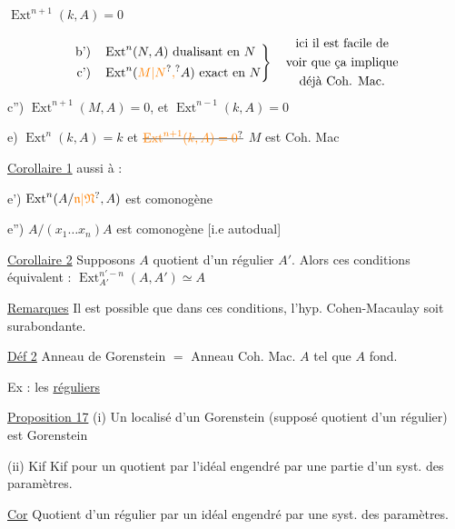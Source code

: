  $\operatorname{Ext}^{n+1}(k,A)=0$

\[
\left.\begin{aligned}
 \text{b')}\quad &\operatorname{Ext}^{n}(N,A)\ \text{dualisant en }N\\
 \text{c')}\quad &\operatorname{Ext}^{n}(\unsure{M|N}\unsure{,}A)\ \text{exact en }N
\end{aligned}\right\}
\quad\begin{gathered}\text{ici il est facile de}\\\text{voir que ça implique}\\\text{déjà Coh. Mac.}\end{gathered}
\]
c'') $\operatorname{Ext}^{n+1}(M,A)=0$, et $\operatorname{Ext}^{n-1}(k,A)=0$

e) $\operatorname{Ext}^{n}(k,A)=k$ et $\deleted{\unsure{\operatorname{Ext}^{n+1}(k,A)=0}}$ $M$ est Coh. Mac



\uline{Corollaire 1}  aussi à :

e') $\operatorname{Ext}^{n}(A/\unsure{\mathfrak n|\mathfrak N},A)$ est comonogène

e'') $A/(x_1\ldots x_n)A$ est comonogène [i.e autodual]

\uline{Corollaire 2} Supposons $A$ quotient d'un régulier $A'$. Alors ces conditions équivalent : $\operatorname{Ext}_{A'}^{n'-n}(A,A')\simeq A$

\uline{Remarques}  Il est possible que dans  ces conditions, l'hyp. Cohen-Macaulay soit surabondante.

\uline{Déf 2} Anneau de Gorenstein $=$ Anneau Coh. Mac. $A$ tel que $A$  fond.

Ex : les \uline{réguliers}

\uline{Proposition 17} (i) Un localisé d'un Gorenstein (supposé quotient d'un régulier) est Gorenstein

(ii) Kif Kif pour un quotient par l'idéal engendré par une partie d'un syst. des paramètres.

\uline{Cor} Quotient d'un régulier par un idéal engendré par une  syst. des paramètres.

